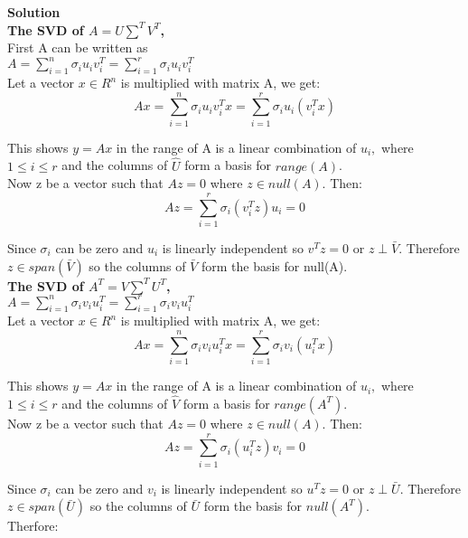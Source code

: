 \documentclass[12pt, oneside]{article}   	%
\begin{document}
\begin{enumerate}
	\textbf{Solution}\\
	
		\textbf{The SVD of $A=U \sum^T V^T$,}\\

	First A can be written as \\
	
	$ A=\sum_{i=1}^{n} \sigma_i u_i v_i^T=\sum_{i=1}^{r} \sigma_i u_i v_i^T$\\
	
	Let a vector $x \in R^n$ is multiplied with matrix A, we get:
	$$ Ax=\sum_{i=1}^{n} \sigma_i u_i v_i^Tx=\sum_{i=1}^{r} \sigma_i u_i (v_i^Tx)$$
	
	This shows $y=Ax$ in the range of A is a linear combination of $u_i,$ where $1 \leq i \leq r$ and the columns of $\hat{U}$ form a basis for $range(A)$.\\
	
	Now z be a vector such that $Az=0$ where $z \in null(A)$. Then:\\
	$$Az=\sum_{i=1}^{r} \sigma_i(v_i^Tz)u_i=0$$
	
	Since $\sigma_i$ can be zero and $u_i$ is linearly independent so $v^Tz=0$ or $z \perp \bar{V}.$ Therefore $z \in span(\bar{V})$ so the columns of $\bar{V}$ form the basis for null(A).\\
	
	\textbf{The SVD of $A^T=V \sum^T U^T$,}\\
	
	$ A=\sum_{i=1}^{n} \sigma_i v_i u_i^T=\sum_{i=1}^{r} \sigma_i v_i u_i^T$\\
	
	Let a vector $x \in R^n$ is multiplied with matrix A, we get:
	$$ Ax=\sum_{i=1}^{n} \sigma_i v_i u_i^Tx=\sum_{i=1}^{r} \sigma_i v_i (u_i^Tx)$$
	
	This shows $y=Ax$ in the range of A is a linear combination of $u_i,$ where $1 \leq i \leq r$ and the columns of $\hat{V}$ form a basis for $range(A^T)$.\\
	
	Now z be a vector such that $Az=0$ where $z \in null(A)$. Then:\\
	$$Az=\sum_{i=1}^{r} \sigma_i(u_i^Tz)v_i=0$$
	
	Since $\sigma_i$ can be zero and $v_i$ is linearly independent so $u^Tz=0$ or $z \perp \bar{U}.$ Therefore $z \in span(\bar{U})$ so the columns of $ \bar{U}$ form the basis for $null(A^T)$.\\
	
	Therfore:\\
	

\end{enumerate}
\end{document}
